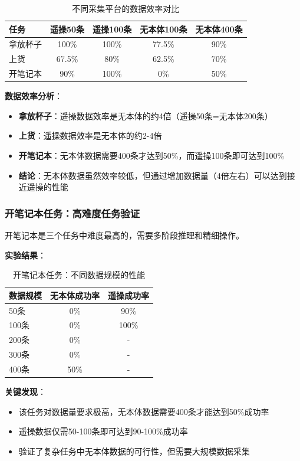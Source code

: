 \begin{table}[htbp]
\centering
\caption{不同采集平台的数据效率对比}
\label{tab:platform_comparison_detail}
\begin{tabular}{lcccc}
\toprule
任务 & 遥操50条 & 遥操100条 & 无本体100条 & 无本体400条 \\
\midrule
拿放杯子 & 100\% & 100\% & 77.5\% & 90\% \\
上货 & 67.5\% & 80\% & 62.5\% & 70\% \\
开笔记本 & 90\% & 100\% & 0\% & 50\% \\
\bottomrule
\end{tabular}
\end{table}

\textbf{数据效率分析}：
\begin{itemize}[leftmargin=2em]
    \item \textbf{拿放杯子}：遥操数据效率是无本体的约4倍（遥操50条=无本体200条）
    \item \textbf{上货}：遥操数据效率是无本体的约2-4倍
    \item \textbf{开笔记本}：无本体数据需要400条才达到50\%，而遥操100条即可达到100\%
    \item \textbf{结论}：无本体数据虽然效率较低，但通过增加数据量（4倍左右）可以达到接近遥操的性能
\end{itemize}

\subsubsection{开笔记本任务：高难度任务验证}

开笔记本是三个任务中难度最高的，需要多阶段推理和精细操作。

\textbf{实验结果}：

\begin{table}[htbp]
\centering
\caption{开笔记本任务：不同数据规模的性能}
\label{tab:open_laptop}
\begin{tabular}{lcc}
\toprule
数据规模 & 无本体成功率 & 遥操成功率 \\
\midrule
50条 & 0\% & 90\% \\
100条 & 0\% & 100\% \\
200条 & 0\% & - \\
300条 & 0\% & - \\
400条 & 50\% & - \\
\bottomrule
\end{tabular}
\end{table}

\textbf{关键发现}：
\begin{itemize}[leftmargin=2em]
    \item 该任务对数据量要求极高，无本体数据需要400条才能达到50\%成功率
    \item 遥操数据仅需50-100条即可达到90-100\%成功率
    \item 验证了复杂任务中无本体数据的可行性，但需要大规模数据采集
\end{itemize}

